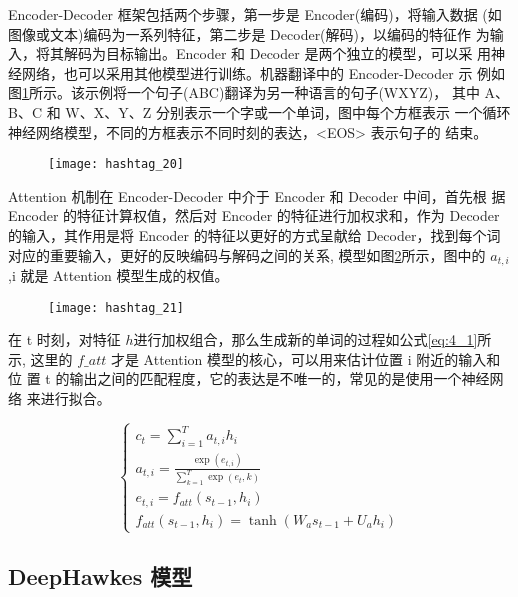 Encoder-Decoder 框架包括两个步骤，第一步是 Encoder(编码)，将输入数据 (如图像或文本)编码为一系列特征，第二步是 Decoder(解码)，以编码的特征作 为输入，将其解码为目标输出。Encoder 和 Decoder 是两个独立的模型，可以采 用神经网络，也可以采用其他模型进行训练。机器翻译中的 Encoder-Decoder 示
例如图\ref{fig:4_3}所示。该示例将一个句子(ABC)翻译为另一种语言的句子(WXYZ)， 其中 A、B、C 和 W、X、Y、Z 分别表示一个字或一个单词，图中每个方框表示 一个循环神经网络模型，不同的方框表示不同时刻的表达，<EOS> 表示句子的 结束。


\begin{figure}[H]
    \centering
    \texttt{[image: hashtag\_20]}
    \label{fig:4_3}
\end{figure}


Attention 机制在 Encoder-Decoder 中介于 Encoder 和 Decoder 中间，首先根 据 Encoder 的特征计算权值，然后对 Encoder 的特征进行加权求和，作为 Decoder 的输入，其作用是将 Encoder 的特征以更好的方式呈献给 Decoder，找到每个词 对应的重要输入，更好的反映编码与解码之间的关系, 模型如图\ref{fig:4_4}所示，图中的 $a_{t,i}$,i 就是 Attention 模型生成的权值。

\begin{figure}[H]
    \centering
    \texttt{[image: hashtag\_21]}
    \label{fig:4_4}
\end{figure}

在 t 时刻，对特征 $h $进行加权组合，那么生成新的单词的过程如公式\ref{eq:4_1}所 示, 这里的 $f\_{att}$ 才是 Attention 模型的核心，可以用来估计位置 i 附近的输入和位 置 t 的输出之间的匹配程度，它的表达是不唯一的，常见的是使用一个神经网络 来进行拟合。

\begin{equation}\label{eq:4_1}
	\begin{cases}
	c_t = \sum_{i=1}^T a_{t,i}h_i \\
	a_{t,i} = \frac{\exp(e_{t,i})}{\sum_{k=1}^T \exp(e_t,k)} \\
	e_{t,i} = f_{att}(s_{t-1},h_i)\\
	f_{att}(s_{t-1},h_i) = \tanh(W_as_{t-1} + U_ah_i)
	\end{cases}
\end{equation}

\subsection{DeepHawkes 模型}


